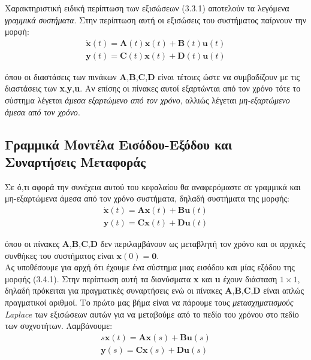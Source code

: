 \documentclass[11pt]{article} %
\numberwithin{equation}{subsection}
\begin{document}
Χαρακτηριστική ειδική περίπτωση των εξισώσεων (3.3.1) αποτελούν τα λεγόμενα \textit{γραμμικά συστήματα}. Στην περίπτωση αυτή οι εξισώσεις του συστήματος παίρνουν την μορφή:
\begin{equation}
\begin{split}
\dot{\textbf{x}}(t) = \textbf{A}(t)\textbf{x}(t) + \textbf{B}(t)\textbf{u}(t) \\
\textbf{y}(t) = \textbf{C}(t)\textbf{x}(t) + \textbf{D}(t)\textbf{u}(t)
\end{split}
\end{equation}

όπου οι διαστάσεις των πινάκων \textbf{A},\textbf{B},\textbf{C},\textbf{D} είναι τέτοιες ώστε να συμβαδίζουν με τις διαστάσεις των \textbf{x},\textbf{y},\textbf{u}. Αν επίσης οι πίνακες αυτοί εξαρτώνται από τον χρόνο τότε το σύστημα λέγεται \textit{άμεσα εξαρτώμενο από τον χρόνο}, αλλιώς λέγεται \textit{μη-εξαρτώμενο άμεσα από τον χρόνο}. \\

\subsection{Γραμμικά Μοντέλα Εισόδου-Εξόδου και Συναρτήσεις Μεταφοράς}
Σε ό,τι αφορά την συνέχεια αυτού του κεφαλαίου θα αναφερόμαστε σε γραμμικά και μη-εξαρτώμενα άμεσα από τον χρόνο συστήματα, δηλαδή συστήματα της μορφής:
\begin{equation}
\begin{split}
\dot{\textbf{x}}(t) = \textbf{A}\textbf{x}(t) + \textbf{B}\textbf{u}(t) \\
\textbf{y}(t) = \textbf{C}\textbf{x}(t) + \textbf{D}\textbf{u}(t)
\end{split}
\end{equation}

όπου οι πίνακες \textbf{A},\textbf{B},\textbf{C},\textbf{D} δεν περιλαμβάνουν ως μεταβλητή τον χρόνο και οι αρχικές συνθήκες του συστήματος είναι $\textbf{x}(0) = \textbf{0}$.\\

Ας υποθέσουμε για αρχή ότι έχουμε ένα σύστημα μιας εισόδου και μίας εξόδου της μορφής (3.4.1). Στην περίπτωση αυτή τα διανύσματα \textbf{x} και \textbf{u} έχουν διάσταση $1 \times 1$, δηλαδή πρόκειται για πραγματικές συναρτήσεις ενώ οι πίνακες  \textbf{A},\textbf{B},\textbf{C},\textbf{D} είναι απλώς πραγματικοί αριθμοί. Το πρώτο μας βήμα είναι να πάρουμε τους \textit{μετασχηματισμούς Laplace} των εξισώσεων αυτών για να μεταβούμε από το πεδίο του χρόνου στο πεδίο των συχνοτήτων. Λαμβάνουμε:
\begin{equation}
\begin{split}
s\textbf{x}(t) = \textbf{A}\textbf{x}(s) + \textbf{B}\textbf{u}(s) \\
\textbf{y}(s) = \textbf{C}\textbf{x}(s) + \textbf{D}\textbf{u}(s)
\end{split}
\end{equation}
\end{document}
